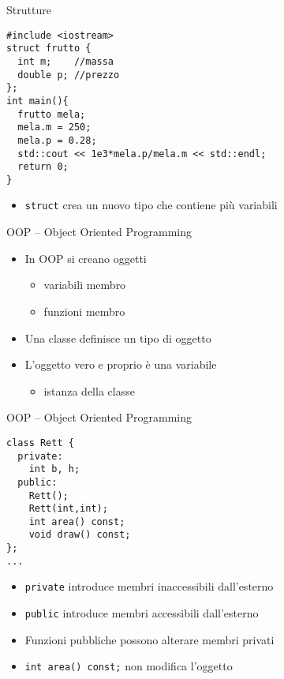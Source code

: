 \begin{frame}[fragile]{Strutture}
  \vfill
  \begin{lstlisting}
#include <iostream>
struct frutto {
  int m;    //massa
  double p; //prezzo
};
int main(){
  frutto mela;
  mela.m = 250;
  mela.p = 0.28;
  std::cout << 1e3*mela.p/mela.m << std::endl;
  return 0;
}
  \end{lstlisting}
  \vfill
  \begin{itemize}
    \item \lstinline$struct$ crea un nuovo tipo che contiene più variabili
  \end{itemize}
  \vfill
\end{frame}

\begin{frame}[fragile]{OOP -- Object Oriented Programming}
  \vfill
  \begin{itemize}
    \item In OOP si creano \alert{oggetti}
    \begin{itemize}
      \item variabili membro
      \item funzioni membro
    \end{itemize}
    \vfill
    \item Una \alert{classe} definisce un \alert{tipo} di oggetto
    \vfill
    \item L'oggetto vero e proprio è una variabile
    \begin{itemize}
      \item \alert{istanza} della classe
    \end{itemize}
  \end{itemize}
  \vfill
\end{frame}

\begin{frame}[fragile]{OOP -- Object Oriented Programming}
  \vfill
  \begin{lstlisting}[firstnumber=2]
class Rett {
  private:
    int b, h;
  public:
    Rett();
    Rett(int,int);
    int area() const;
    void draw() const;
};
...
  \end{lstlisting}
  \vfill
  \begin{itemize}
    \item \lstinline$private$ introduce membri inaccessibili dall'esterno
    \vfill
    \item \lstinline$public$ introduce membri accessibili dall'esterno
    \vfill
    \item Funzioni pubbliche possono alterare membri privati
    \vfill
    \item \lstinline$int area() const;$ non modifica l'oggetto
  \end{itemize}
  \vfill
\end{frame}

